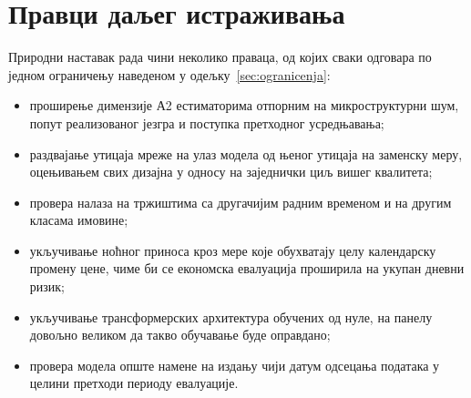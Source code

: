 \section{Правци даљег истраживања}

Природни наставак рада чини неколико праваца, од којих сваки одговара по једном
ограничењу наведеном у одељку~\ref{sec:ogranicenja}:

\begin{itemize}
\item проширење димензије А2 естиматорима отпорним на микроструктурни шум, попут
      реализованог језгра и поступка претходног усредњавања;
\item раздвајање утицаја мреже на улаз модела од њеног утицаја на заменску меру, оцењивањем
      свих дизајна у односу на заједнички циљ вишег квалитета;
\item провера налаза на тржиштима са другачијим радним временом и на другим класама
      имовине;
\item укључивање ноћног приноса кроз мере које обухватају целу календарску промену
      цене, чиме би се економска евалуација проширила на укупан дневни ризик;
\item укључивање трансформерских архитектура обучених од нуле, на панелу довољно
      великом да такво обучавање буде оправдано;
\item провера модела опште намене на издању чији датум одсецања података у целини
      претходи периоду евалуације.
\end{itemize}
